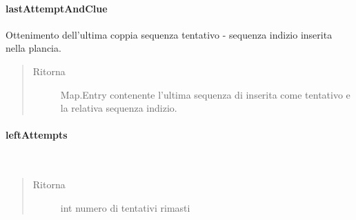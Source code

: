 \documentclass[letterpaper,10pt,italian,openany,oneside]{sphinxmanual}
\begin{document}
\paragraph{lastAttemptAndClue}
\label{\detokenize{test/it/unicam/cs/pa/mastermind/gamecore/BoardModel:lastattemptandclue}}

\begin{fulllineitems}
\label{\detokenize{test/it/unicam/cs/pa/mastermind/gamecore/BoardModel:it.unicam.cs.pa.mastermind.gamecore.BoardModel.lastAttemptAndClue()}}
Ottenimento dell’ultima coppia sequenza tentativo - sequenza indizio inserita nella plancia.
\begin{quote}\begin{description}
\item[{Ritorna}] \leavevmode
Map.Entry contenente l’ultima sequenza di  inserita come tentativo e la relativa sequenza indizio.

\end{description}\end{quote}

\end{fulllineitems}



\paragraph{leftAttempts}
\label{\detokenize{test/it/unicam/cs/pa/mastermind/gamecore/BoardModel:leftattempts}}

\begin{fulllineitems}
\label{\detokenize{test/it/unicam/cs/pa/mastermind/gamecore/BoardModel:it.unicam.cs.pa.mastermind.gamecore.BoardModel.leftAttempts()}}~\begin{quote}\begin{description}
\item[{Ritorna}] \leavevmode
int numero di tentativi rimasti

\end{description}\end{quote}

\end{fulllineitems}
\end{document}
